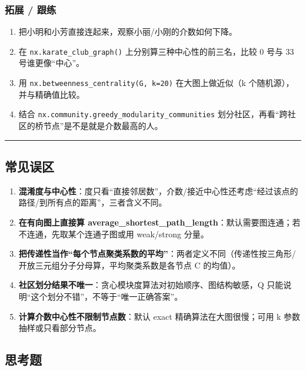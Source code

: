 \subsubsection{拓展 / 跟练}\label{ux62d3ux5c55-ux8ddfux7ec3-13}

\begin{enumerate}
\def\labelenumi{\arabic{enumi}.}
\tightlist
\item
  把小明和小芳直接连起来，观察小丽/小刚的介数如何下降。
\item
  在 \texttt{nx.karate\_club\_graph()} 上分别算三种中心性的前三名，比较
  0 号与 33 号谁更像``中心''。
\item
  用 \texttt{nx.betweenness\_centrality(G,\ k=20)} 在大图上做近似（k
  个随机源），并与精确值比较。
\item
  结合 \texttt{nx.community.greedy\_modularity\_communities}
  划分社区，再看``跨社区的桥节点''是不是就是介数最高的人。
\end{enumerate}

\begin{center}\rule{0.5\linewidth}{0.5pt}\end{center}

\subsection{常见误区}\label{ux5e38ux89c1ux8befux533a-18}

\begin{enumerate}
\def\labelenumi{\arabic{enumi}.}
\tightlist
\item
  \textbf{混淆度与中心性}：度只看``直接邻居数''，介数/接近中心性还考虑``经过该点的路径/到所有点的距离''，三者含义不同。
\item
  \textbf{在有向图上直接算
  average\_shortest\_path\_length}：默认需要图连通；若不连通，先取某个连通子图或用
  weak/strong 分量。
\item
  \textbf{把传递性当作``每个节点聚类系数的平均''}：两者定义不同（传递性按三角形/开放三元组分子分母算，平均聚类系数是各节点
  C 的均值）。
\item
  \textbf{社区划分结果不唯一}：贪心模块度算法对初始顺序、图结构敏感，Q
  只能说明``这个划分不错''，不等于``唯一正确答案''。
\item
  \textbf{计算介数中心性不限制节点数}：默认 exact
  精确算法在大图很慢；可用 k 参数抽样或只看部分节点。
\end{enumerate}

\subsection{思考题}\label{ux601dux8003ux9898-20}

